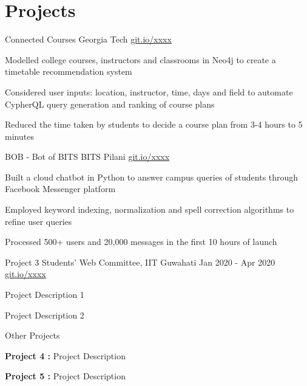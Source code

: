 \section{Projects}
\resumeSubHeadingListStart

\resumeProject
{Connected Courses}
{Georgia Tech} %
{} %
{\href{https://github.com/}{git.io/xxxx}} 
\resumeItemListStart
    \item[$\bullet$]{Modelled college courses, instructors and classrooms in Neo4j to create a timetable recommendation system}
	\item[$\bullet$]{Considered user inputs: location, instructor, time, days and field to automate CypherQL query generation and ranking of course plans}
	\item[$\bullet$]{Reduced the time taken by students to decide a course plan from 3-4 hours to 5 minutes}
\resumeItemListEnd


\resumeProject
{BOB - Bot of BITS} %
{BITS Pilani} %
{} %
{\href{https://github.com/}{git.io/xxxx}} %
\resumeItemListStart
\item[$\bullet$]{Built a cloud chatbot in Python to answer campus queries of students through Facebook Messenger platform}
	\item[$\bullet$]{Employed keyword indexing, normalization and spell correction algorithms to refine user queries}
	\item[$\bullet$]{Processed 500+ users and 20,000 messages in the first 10 hours of launch}
\resumeItemListEnd

\resumeProject
{Project 3} %
{Students' Web Committee, IIT Guwahati} %
{Jan 2020 - Apr 2020} %
{\href{https://github.com/}{git.io/xxxx}} %
\resumeItemListStart
\item[$\bullet$] Project Description 1
\item[$\bullet$] Project Description 2
\resumeItemListEnd


\resumeProject
{Other Projects}{}{}{}
\vspace{-3.5mm}
\resumeItemListStart
\item[$\bullet$] \textbf{Project 4  :} Project Description

\item[$\bullet$] \textbf{Project 5  :} Project Description

\resumeItemListEnd
\resumeSubHeadingListEnd

\vspace{-5.5mm}

